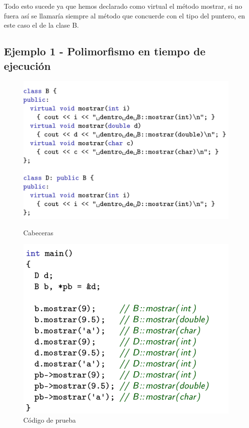 Todo esto sucede ya que hemos declarado como virtual el método mostrar, si no fuera así se llamaría siempre al método que concuerde con el tipo del puntero, en este caso el de la clase B.

\subsection{Ejemplo 1 - Polimorfismo en tiempo de ejecución}

\begin{figure}[h]
	\begin{minipage}{0.55\textwidth}
		\includegraphics[width=\textwidth]{Imagenes/pol3.png}
		\caption{Cabeceras}
	\end{minipage}
	\hfill
	\begin{minipage}{0.45\textwidth}
		\includegraphics[width=\textwidth]{Imagenes/pol4.png}
		\caption{Código de prueba}
	\end{minipage}
\end{figure}

